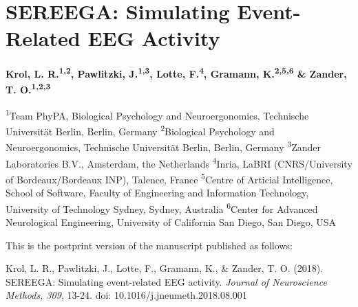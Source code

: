 
\chapter{SEREEGA: Simulating Event-Related EEG Activity}
%
\label{chapter:sereega}%


{\chaptermeta 

\textbf{Krol, L. R.\textsuperscript{1,2}, Pawlitzki, J.\textsuperscript{1,3}, Lotte, F.\textsuperscript{4}, Gramann, K.\textsuperscript{2,5,6} \& Zander, T. O.\textsuperscript{1,2,3}}

{\small
\textsuperscript{1}Team PhyPA, Biological Psychology and Neuroergonomics, Technische Universität Berlin, Berlin, Germany
\textsuperscript{2}Biological Psychology and Neuroergonomics, Technische Universität Berlin, Berlin, Germany
\textsuperscript{3}Zander Laboratories B.V., Amsterdam, the Netherlands
\textsuperscript{4}Inria, LaBRI (CNRS/University of Bordeaux/Bordeaux INP), Talence, France
\textsuperscript{5}Centre of Articial Intelligence, School of Software, Faculty of Engineering and Information Technology, University of Technology Sydney, Sydney, Australia 
\textsuperscript{6}Center for Advanced Neurological Engineering, University of California San Diego, San Diego, USA

This is the postprint version of the manuscript published as follows:

Krol, L. R., Pawlitzki, J., Lotte, F., Gramann, K., \& Zander, T. O. (2018). SEREEGA: Simulating event-related EEG activity. \emph{Journal of Neuroscience Methods, 309}, 13-24. doi: 10.1016/j.jneumeth.2018.08.001\nocite{krol2018sereega}
\par}}


